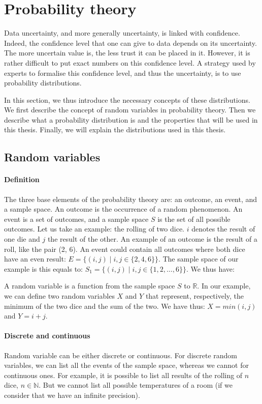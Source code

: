 \section{Probability theory}

Data uncertainty, and more generally uncertainty, is linked with confidence.
Indeed, the confidence level that one can give to data depends on its uncertainty.
The more uncertain value is, the less trust it can be placed in it.
However, it is rather difficult to put exact numbers on this confidence level.
A strategy used by experts to formalise this confidence level, and thus the uncertainty, is to use probability distributions.

In this section, we thus introduce the necessary concepts of these distributions.
We first describe the concept of random variables in probability theory.
Then we describe what a probability distribution is and the properties that will be used in this thesis.
Finally, we will explain the distributions used in this thesis.

\subsection{Random variables}

\paragraph{Definition}
The three base elements of the probability theory are: an outcome, an event, and a sample space.
An outcome is the occurrence of a random phenomenon.
An event is a set of outcomes, and a sample space $S$ is the set of all possible outcomes.
Let us take an example: the rolling of two dice.
$i$ denotes the result of one die and $j$ the result of the other.
An example of an outcome is the result of a roll, like the pair (2, 6).
An event could contain all outcomes where both dice have an even result: $E = \{ (i,j) \mid i,j \in \{2, 4, 6\}\}$.
The sample space of our example is this equals to: $S_1 = \{ (i,j) \mid i,j \in \{1, 2, \dots , 6\} \}$.
We thus have: 

A random variable is a function from the sample space $S$ to $\mathds{R}$.
In our example, we can define two random variables $X$ and $Y$ that represent, respectively, the minimum of the two dice and the sum of the two.
We have thus: $X= min(i, j)$ and $Y= i + j$.

\paragraph{Discrete and continuous}
Random variable can be either discrete or continuous.
For discrete random variables, we can list all the events of the sample space, whereas we cannot for continuous ones.
For example, it is possible to list all results of the rolling of $n$ dice, $n \in \mathds{N}$.
But we cannot list all possible temperatures of a room (if we consider that we have an infinite precision).


